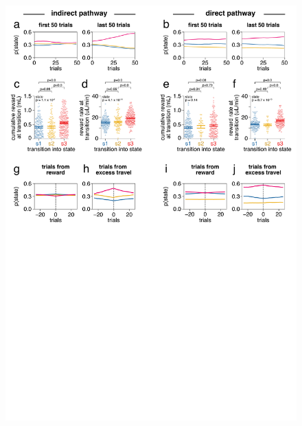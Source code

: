 \begin{figure}[t!]
  \begin{center}
    \includegraphics[width=0.90\linewidth]{ch7-appendix1/appendix1-figures/ExtData_Fig8.pdf}

\end{center}
\end{figure}
